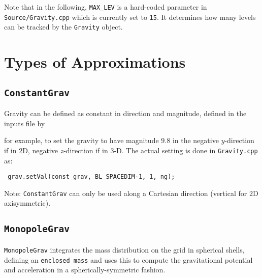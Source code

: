 Note that in the following, {\tt MAX\_LEV} is a hard-coded parameter
in {\tt Source/Gravity.cpp} which is currently set to {\tt 15}.  It
determines how many levels can be tracked by the {\tt Gravity} object.


\section{Types of Approximations}

\subsection{{\tt ConstantGrav}}

Gravity can be defined as constant in direction and magnitude,
defined in the inputs file by


for example, to set the gravity to have magnitude $9.8$ in the
negative $y$-direction if in 2D, negative $z$-direction if in 3-D.
The actual setting is done in {\tt Gravity.cpp} as:
\begin{lstlisting}
 grav.setVal(const_grav, BL_SPACEDIM-1, 1, ng);
\end{lstlisting}


Note: {\tt ConstantGrav} can only be used along a Cartesian direction
(vertical for 2D axisymmetric).


\subsection{{\tt MonopoleGrav}}
\label{sec-monopole-grav}

{\tt MonopoleGrav} integrates the mass distribution on the grid
in spherical shells, defining an {\tt enclosed mass} and uses this
to compute the gravitational potential and acceleration in a 
spherically-symmetric fashion.

